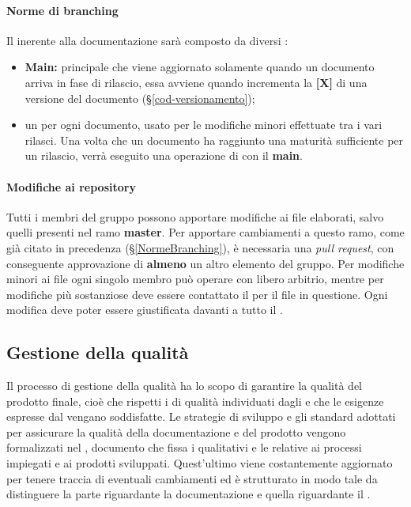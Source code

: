 {{\paragraph*{Norme di branching}
\label{NormeBranching}
Il  inerente alla documentazione sarà composto da diversi :
\begin{itemize}
	\item \textbf{Main:}  principale che viene aggiornato solamente quando un documento arriva in fase di rilascio, essa avviene quando incrementa la \textbf{[X]} di una versione del documento (\S{}\ref{cod-versionamento});
	\item un  per ogni documento, usato per le modifiche minori effettuate tra i vari rilasci. Una volta che un documento ha raggiunto una maturità sufficiente per un rilascio, verrà eseguito una operazione di  con il \textbf{main}.
\end{itemize}
\paragraph*{Modifiche ai repository}
Tutti i membri del gruppo possono apportare modifiche ai file elaborati, salvo quelli presenti nel ramo \textbf{master}. Per apportare cambiamenti a questo ramo, come già citato in precedenza (\S{}\ref{NormeBranching}), è necessaria una \textit{pull request}, con conseguente approvazione di \textbf{almeno} un altro elemento del gruppo.\newline
Per modifiche minori ai file ogni singolo membro può operare con libero arbitrio, mentre per modifiche più sostanziose deve essere contattato il \RdP{} per il file in questione.\newline
Ogni modifica deve poter essere giustificata davanti a tutto il .
\newpage
\subsection{Gestione della qualità}

Il processo di gestione della qualità ha lo scopo di garantire la qualità del prodotto finale, cioè che rispetti i  di qualità individuati dagli  e che le esigenze espresse dal  vengano soddisfatte. Le strategie di sviluppo e gli standard adottati per assicurare la qualità della documentazione e del prodotto vengono formalizzati nel \PdQ{}, documento che fissa i  qualitativi e le  relative ai processi impiegati e ai prodotti sviluppati. Quest'ultimo viene costantemente aggiornato per tenere traccia di eventuali cambiamenti ed è strutturato in modo tale da distinguere la parte riguardante la documentazione e quella riguardante il .
}}
